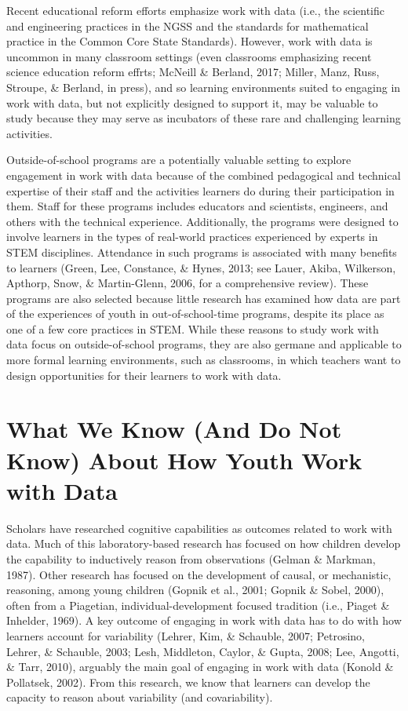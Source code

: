\documentclass[]{book}
\theoremstyle{definition}
\theoremstyle{definition}
\theoremstyle{definition}
\theoremstyle{remark}
\begin{document}
Recent educational reform efforts emphasize work with data (i.e., the
scientific and engineering practices in the NGSS and the standards for
mathematical practice in the Common Core State Standards). However, work
with data is uncommon in many classroom settings (even classrooms
emphasizing recent science education reform effrts; McNeill \& Berland,
2017; Miller, Manz, Russ, Stroupe, \& Berland, in press), and so
learning environments suited to engaging in work with data, but not
explicitly designed to support it, may be valuable to study because they
may serve as incubators of these rare and challenging learning
activities.

Outside-of-school programs are a potentially valuable setting to explore
engagement in work with data because of the combined pedagogical and
technical expertise of their staff and the activities learners do during
their participation in them. Staff for these programs includes educators
and scientists, engineers, and others with the technical experience.
Additionally, the programs were designed to involve learners in the
types of real-world practices experienced by experts in STEM
disciplines. Attendance in such programs is associated with many
benefits to learners (Green, Lee, Constance, \& Hynes, 2013; see Lauer,
Akiba, Wilkerson, Apthorp, Snow, \& Martin-Glenn, 2006, for a
comprehensive review). These programs are also selected because little
research has examined how data are part of the experiences of youth in
out-of-school-time programs, despite its place as one of a few core
practices in STEM. While these reasons to study work with data focus on
outside-of-school programs, they are also germane and applicable to more
formal learning environments, such as classrooms, in which teachers want
to design opportunities for their learners to work with data.

\section{What We Know (And Do Not Know) About How Youth Work with
Data}\label{what-we-know-and-do-not-know-about-how-youth-work-with-data}

Scholars have researched cognitive capabilities as outcomes related to
work with data. Much of this laboratory-based research has focused on
how children develop the capability to inductively reason from
observations (Gelman \& Markman, 1987). Other research has focused on
the development of causal, or mechanistic, reasoning, among young
children (Gopnik et al., 2001; Gopnik \& Sobel, 2000), often from a
Piagetian, individual-development focused tradition (i.e., Piaget \&
Inhelder, 1969). A key outcome of engaging in work with data has to do
with how learners account for variability (Lehrer, Kim, \& Schauble,
2007; Petrosino, Lehrer, \& Schauble, 2003; Lesh, Middleton, Caylor, \&
Gupta, 2008; Lee, Angotti, \& Tarr, 2010), arguably the main goal of
engaging in work with data (Konold \& Pollatsek, 2002). From this
research, we know that learners can develop the capacity to reason about
variability (and covariability).
\end{document}
